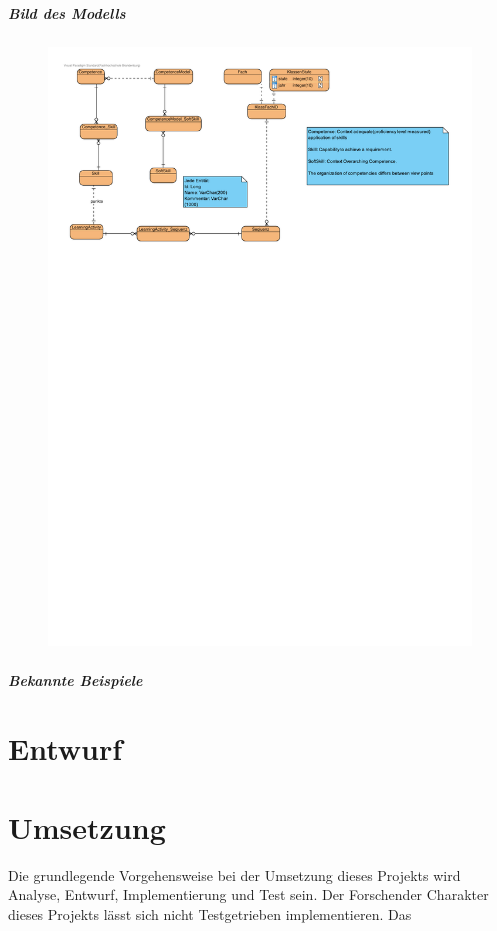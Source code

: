 \documentclass[
12pt,
english,
ngerman,
headsepline,
twoside,
openright,
numbers=noenddot,version=first
]{scrreprt}
\begin{document}
\paragraph{Bild des Modells}
\begin{figure}
	\includegraphics[scale=0.5]{./pics/koma-er-physical.pdf}
\end{figure}

\paragraph{Bekannte Beispiele}

\chapter{Entwurf}
\label{chap:design}

\chapter{Umsetzung}
\label{chap:impl}
Die grundlegende Vorgehensweise bei der Umsetzung dieses Projekts wird Analyse, Entwurf, Implementierung und Test sein. Der Forschender Charakter dieses Projekts lässt sich nicht Testgetrieben implementieren.
Das
\end{document}

